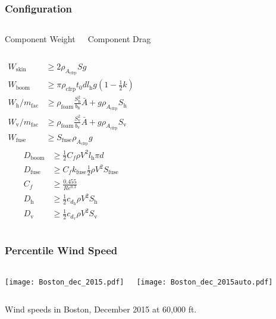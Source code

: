\documentclass{beamer}
\begin{document}
\begin{frame}
    \frametitle{Configuration}
    
    \begin{columns}
        \begin{center}
        Component Weight
        \end{center}
        \begin{center}
        Component Drag
        \end{center}
    \end{columns}

    \begin{columns}
        \scriptsize
        \begin{align*}
        W_{\text{skin}} &\geq 2 \rho_{A_{\text{cfrp}}} S g \\
        W_{\text{boom}} &\geq \pi \rho_{\text{cfrp}} t_0 d l_{\text{h}}g \left( 1 - \frac{1}{2} k\right) \\
        W_{\text{h}}/m_{\text{fac}} &\geq \rho_{\text{foam}} \frac{S_{\text{h}}^2}{b_{\text{h}}} \bar{A} + g\rho_{A_{\text{cfrp}}} S_{\text{h}} \\
        W_{\text{v}}/m_{\text{fac}} &\geq \rho_{\text{foam}} \frac{S_{\text{v}}^2}{b_{\text{v}}} \bar{A} + g\rho_{A_{\text{cfrp}}} S_{\text{v}} \\
            W_{\text{fuse}} &\geq S_{\text{fuse}} \rho_{A_{\text{cfrp}}} g
        \end{align*}
        \scriptsize
        \begin{align*}
        D_{\text{boom}} &\geq \frac{1}{2} C_f \rho V^2 l_{\text{h}}\pi d \\
        D_{\text{fuse}} &\geq C_f k_{\text{fuse}} \frac{1}{2} \rho V^2 S_{\text{fuse}} \\
        C_f &\geq \frac{0.455}{Re^{0.3}} \\
        D_{\text{h}} &\geq \frac{1}{2} c_{d_{\text{h}}} \rho V^2 S_{\text{h}} \\
        D_{\text{v}} &\geq \frac{1}{2} c_{d_{\text{v}}} \rho V^2 S_{\text{v}} 
        \end{align*}
    \end{columns}

\end{frame}

\begin{frame}
    \frametitle{Percentile Wind Speed}
    
    \pause
    \begin{columns}
        \texttt{[image: Boston\_dec\_2015.pdf]}
    
        \texttt{[image: Boston\_dec\_2015auto.pdf]}
    \end{columns}

    \begin{center}
    Wind speeds in Boston, December 2015 at 60,000 ft. 
    \end{center}
    
\end{frame}
\end{document}
